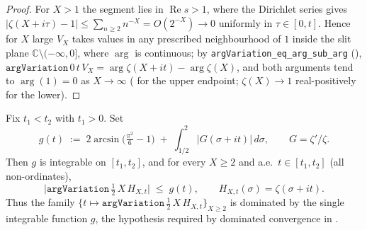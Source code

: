 \begin{proof}
\leanok
{}
For $X>1$ the segment lies in $\operatorname{Re}s>1$, where the Dirichlet series
gives $|\zeta(X+i\tau)-1|\le\sum_{n\ge2}n^{-X}=O(2^{-X})\to0$ uniformly in
$\tau\in[0,t]$. Hence for $X$ large $V_X$ takes values in any prescribed
neighbourhood of $1$ inside the slit plane $\mathbb{C}\setminus(-\infty,0]$, where
$\arg$ is continuous; by \texttt{argVariation\_eq\_arg\_sub\_arg}
(),
$\texttt{argVariation}\,0\,t\,V_X=\arg\zeta(X+it)-\arg\zeta(X)$, and both arguments
tend to $\arg(1)=0$ as $X\to\infty$ ( for the upper
endpoint; $\zeta(X)\to1$ real-positively for the lower).
\end{proof}

\begin{lemma}
\label{lem:lb_horiz_argVar_bdd}
\leanok
Fix $t_1<t_2$ with $t_1>0$. Set
\[
  g(t)\;:=\;2\arcsin\!\bigl(\tfrac{\pi^2}{6}-1\bigr)
            \;+\;\int_{1/2}^{2}\lvert G(\sigma+it)\rvert\,d\sigma,
  \qquad G=\zeta'/\zeta .
\]
Then $g$ is integrable on $[t_1,t_2]$, and for every $X\ge2$ and a.e.\ $t\in[t_1,t_2]$
(all non-ordinates),
\[
  \bigl|\texttt{argVariation}\,\tfrac12\,X\,H_{X,t}\bigr| \;\le\; g(t),
  \qquad H_{X,t}(\sigma)=\zeta(\sigma+it).
\]
Thus the family $\{t\mapsto\texttt{argVariation}\,\tfrac12\,X\,H_{X,t}\}_{X\ge2}$
is dominated by the single integrable function $g$, the hypothesis required by
dominated convergence in .
\end{lemma}

